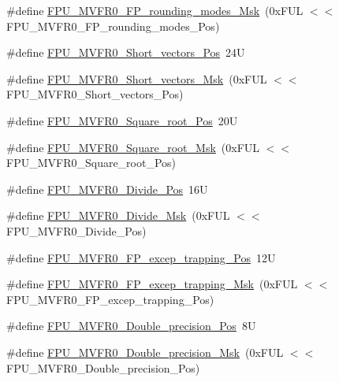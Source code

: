 \begin{DoxyCompactItemize}
\#define \mbox{\hyperlink{group___c_m_s_i_s___f_p_u_gae6dc9339ac72227d5d54360bb9fbef1b}{F\+P\+U\+\_\+\+M\+V\+F\+R0\+\_\+\+F\+P\+\_\+rounding\+\_\+modes\+\_\+\+Msk}}~(0x\+F\+U\+L $<$$<$ F\+P\+U\+\_\+\+M\+V\+F\+R0\+\_\+\+F\+P\+\_\+rounding\+\_\+modes\+\_\+\+Pos)
\item 
\#define \mbox{\hyperlink{group___c_m_s_i_s___f_p_u_gabbf83a918536ebf10889cee71a0404c7}{F\+P\+U\+\_\+\+M\+V\+F\+R0\+\_\+\+Short\+\_\+vectors\+\_\+\+Pos}}~24U
\item 
\#define \mbox{\hyperlink{group___c_m_s_i_s___f_p_u_gabf261a72023fdfc64f32c6b21d55c5b9}{F\+P\+U\+\_\+\+M\+V\+F\+R0\+\_\+\+Short\+\_\+vectors\+\_\+\+Msk}}~(0x\+F\+U\+L $<$$<$ F\+P\+U\+\_\+\+M\+V\+F\+R0\+\_\+\+Short\+\_\+vectors\+\_\+\+Pos)
\item 
\#define \mbox{\hyperlink{group___c_m_s_i_s___f_p_u_ga176c85453ba03257bf263adec05f7344}{F\+P\+U\+\_\+\+M\+V\+F\+R0\+\_\+\+Square\+\_\+root\+\_\+\+Pos}}~20U
\item 
\#define \mbox{\hyperlink{group___c_m_s_i_s___f_p_u_ga3ec0bfec1640bdaf9dff027f275b446d}{F\+P\+U\+\_\+\+M\+V\+F\+R0\+\_\+\+Square\+\_\+root\+\_\+\+Msk}}~(0x\+F\+U\+L $<$$<$ F\+P\+U\+\_\+\+M\+V\+F\+R0\+\_\+\+Square\+\_\+root\+\_\+\+Pos)
\item 
\#define \mbox{\hyperlink{group___c_m_s_i_s___f_p_u_ga167be203091e6cc7d00ad40ca48c4396}{F\+P\+U\+\_\+\+M\+V\+F\+R0\+\_\+\+Divide\+\_\+\+Pos}}~16U
\item 
\#define \mbox{\hyperlink{group___c_m_s_i_s___f_p_u_gaeb7370768c6cdf06f8a15c86c6102ed2}{F\+P\+U\+\_\+\+M\+V\+F\+R0\+\_\+\+Divide\+\_\+\+Msk}}~(0x\+F\+U\+L $<$$<$ F\+P\+U\+\_\+\+M\+V\+F\+R0\+\_\+\+Divide\+\_\+\+Pos)
\item 
\#define \mbox{\hyperlink{group___c_m_s_i_s___f_p_u_ga5c0715c41c4470f8bb0b6dcd34707f1c}{F\+P\+U\+\_\+\+M\+V\+F\+R0\+\_\+\+F\+P\+\_\+excep\+\_\+trapping\+\_\+\+Pos}}~12U
\item 
\#define \mbox{\hyperlink{group___c_m_s_i_s___f_p_u_ga29bbddd679e821e050699fda23e6c85e}{F\+P\+U\+\_\+\+M\+V\+F\+R0\+\_\+\+F\+P\+\_\+excep\+\_\+trapping\+\_\+\+Msk}}~(0x\+F\+U\+L $<$$<$ F\+P\+U\+\_\+\+M\+V\+F\+R0\+\_\+\+F\+P\+\_\+excep\+\_\+trapping\+\_\+\+Pos)
\item 
\#define \mbox{\hyperlink{group___c_m_s_i_s___f_p_u_ga461e26147be0c39402a78cb6249e8f84}{F\+P\+U\+\_\+\+M\+V\+F\+R0\+\_\+\+Double\+\_\+precision\+\_\+\+Pos}}~8U
\item 
\#define \mbox{\hyperlink{group___c_m_s_i_s___f_p_u_ga3f2c8c6c759ffe70f548a165602ea901}{F\+P\+U\+\_\+\+M\+V\+F\+R0\+\_\+\+Double\+\_\+precision\+\_\+\+Msk}}~(0x\+F\+U\+L $<$$<$ F\+P\+U\+\_\+\+M\+V\+F\+R0\+\_\+\+Double\+\_\+precision\+\_\+\+Pos)

\end{DoxyCompactItemize}
